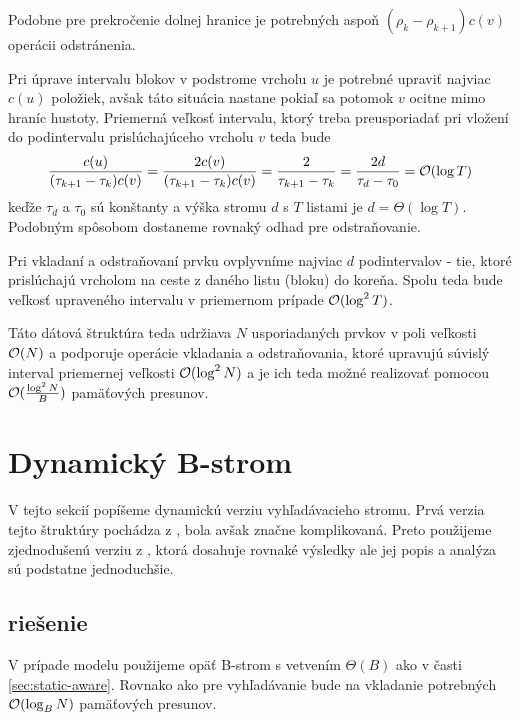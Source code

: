 Podobne pre prekročenie dolnej hranice je potrebných aspoň $(\rho_k-\rho_{k+1})c(v)$ operácii odstránenia.

Pri úprave intervalu blokov v podstrome vrcholu $u$ je potrebné upraviť najviac $c(u)$ položiek, avšak táto situácia nastane pokiaľ sa potomok $v$ ocitne mimo hraníc hustoty. Priemerná veľkosť intervalu, ktorý treba preusporiadať pri vložení do podintervalu prislúchajúceho vrcholu $v$ teda bude
\[
\frac{c(u)}{(\tau_{k+1}-\tau_k)c(v)} = \frac{2c(v)}{(\tau_{k+1}-\tau_k)c(v)} = \frac{2}{\tau_{k+1}-\tau_k} = \frac{2d}{\tau_d-\tau_0} = \mathcal{O}(\log{T})
\]
keďže $\tau_d$ a $\tau_0$ sú konštanty a výška stromu $d$ s $T$ listami je $d = \Theta(\log{T})$. Podobným spôsobom dostaneme rovnaký odhad pre odstraňovanie.

Pri vkladaní a odstraňovaní prvku ovplyvníme najviac $d$ podintervalov - tie, ktoré prislúchajú vrcholom na ceste z daného listu (bloku) do koreňa. Spolu teda bude veľkosť upraveného intervalu v priemernom prípade $\mathcal{O}(\log^2{T})$.


Táto dátová štruktúra teda udržiava $N$ usporiadaných prvkov v poli veľkosti $\mathcal{O}(N)$ a podporuje operácie vkladania a odstraňovania, ktoré upravujú súvislý interval priemernej veľkosti $\mathcal{O}(\log^2{N})$ a je ich teda možné realizovať pomocou $\mathcal{O}(\frac{\log^2{N}}{B})$ pamäťových presunov.

\section{Dynamický B-strom} \label{sec:dynamic-obliv}

V tejto sekcií popíšeme dynamickú verziu \obliv vyhľadávacieho stromu. Prvá verzia tejto štruktúry pochádza z \citep{btreeshort,btreefull}, bola avšak značne komplikovaná. Preto použijeme zjednodušenú verziu z \citep{bender2002}, ktorá dosahuje rovnaké výsledky ale jej popis a analýza sú podstatne jednoduchšie.

\subsection{\Aware riešenie}
V prípade \aware modelu použijeme opäť B-strom s vetvením $\Theta(B)$ ako v časti \ref{sec:static-aware}. Rovnako ako pre vyhľadávanie bude na vkladanie potrebných $\mathcal{O}(\log_B{N})$ pamäťových presunov. 

